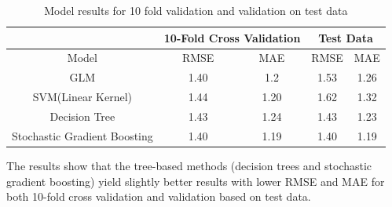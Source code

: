 \documentclass[12pt,english]{report}
\begin{document}
\begin{table}[H]
\centering
\caption{Model results for 10 fold validation and validation on test data}
\label{num_year}
\begin{tabular}{|c|c|c|c|c|} \hline
                             & \multicolumn{2}{c|}{10-Fold Cross Validation} &
\multicolumn{2}{c|}{Test Data} \\ \hline
Model                        & RMSE                  & MAE                   & RMSE           & MAE           \\ \hline
GLM                          & 1.40                  & 1.2                   & 1.53           & 1.26          \\ \hline
SVM(Linear Kernel)           & 1.44                  & 1.20                  & 1.62           & 1.32          \\ \hline
Decision Tree                         & 1.43                  & 1.24        & 1.43           & 1.23          \\ \hline
Stochastic Gradient Boosting & 1.40                  & 1.19                  & 1.40           & 1.19           \\ \hline
\end{tabular}
\end{table}

The results show that the tree-based methods (decision trees and stochastic gradient boosting) yield slightly better results with lower RMSE and MAE for both 10-fold cross validation and validation based on test data.
\end{document}
